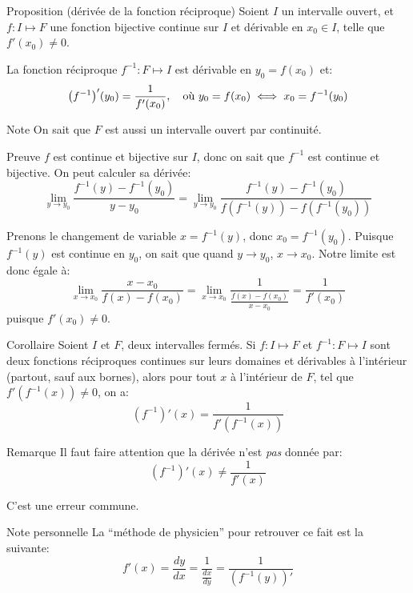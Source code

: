 \documentclass[a4paper]{article}
\begin{document}
\begin{parag}{Proposition (dérivée de la fonction réciproque)}
    Soient $I$ un intervalle ouvert, et $f : I \mapsto F$ une fonction bijective continue sur $I$ et dérivable en $x_0 \in I$, telle que $f'\left(x_0\right) \neq 0$.

    La fonction réciproque $f^{-1} : F \mapsto I$ est dérivable en $y_0 = f\left(x_0\right)$ et: 
    \[\left(f^{-1}\right)'\left(y_0\right) = \frac{1}{f'\left(x_0\right)}, \mathspace \text{où } y_0 = f\left(x_0\right) \iff x_0 = f^{-1}\left(y_0\right)\]
   
    \begin{subparag}{Note}
        On sait que $F$ est aussi un intervalle ouvert par continuité.
    \end{subparag}
    

    \begin{subparag}{Preuve}
        $f$ est continue et bijective sur $I$, donc on sait que $f^{-1}$ est continue et bijective. On peut calculer sa dérivée: 
        \[\lim_{y \to y_0} \frac{f^{-1}\left(y\right) - f^{-1}\left(y_0\right)}{y - y_0} = \lim_{y \to y_0} \frac{f^{-1}\left(y\right) - f^{-1}\left(y_0\right)}{f\left(f^{-1}\left(y\right)\right) - f\left(f^{-1}\left(y_0\right)\right)}\]
        
        Prenons le changement de variable $x = f^{-1}\left(y\right)$, donc $x_0 = f^{-1}\left(y_0\right)$. Puisque $f^{-1}\left(y\right)$ est continue en $y_0$, on sait que quand $y \to y_0$, $x \to x_0$. Notre limite est donc égale à: 
        \[\lim_{x \to x_0} \frac{x - x_0}{f\left(x\right) - f\left(x_0\right)} = \lim_{x \to x_0} \frac{1}{\frac{f\left(x\right) - f\left(x_0\right)}{x - x_0}} = \frac{1}{f'\left(x_0\right)}\]
        puisque $f'\left(x_0\right) \neq 0$.
    \end{subparag}
\end{parag}

\begin{parag}{Corollaire}
    Soient $I$ et $F$, deux intervalles fermés. Si $f : I \mapsto F$ et $f^{-1} : F \mapsto I$ sont deux fonctions réciproques continues sur leurs domaines et dérivables à l'intérieur (partout, sauf aux bornes), alors pour tout $x$ à l'intérieur de $F$, tel que $f'\left(f^{-1}\left(x\right)\right) \neq 0$, on a: 
    \[\left(f^{-1}\right)'\left(x\right) = \frac{1}{f'\left(f^{-1}\left(x\right)\right)}\]

    \begin{subparag}{Remarque}
        Il faut faire attention que la dérivée n'est \textit{pas} donnée par: 
        \[\left(f^{-1}\right)'\left(x\right) \neq \frac{1}{f'\left(x\right)}\]

        C'est une erreur commune.
    \end{subparag}

    \begin{subparag}{Note personnelle}
        La ``méthode de physicien'' pour retrouver ce fait est la suivante: 
    \[f'\left(x\right) = \frac{dy}{dx} = \frac{1}{\frac{dx}{dy}} = \frac{1}{\left(f^{-1}\left(y\right)\right)'}\]
    \end{subparag}
\end{parag}
\end{document}
